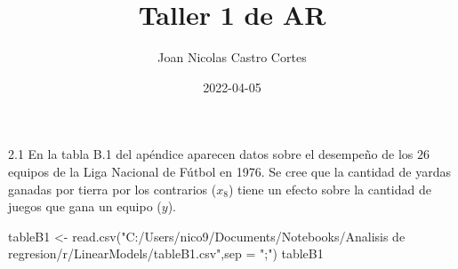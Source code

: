 \documentclass[
]{article}
\title{Taller 1 de AR}
\author{Joan Nicolas Castro Cortes}
\date{2022-04-05}
\newenvironment{Shaded}{\begin{snugshade}}{\end{snugshade}}
\newcommand{\AttributeTok}[1]{\textcolor[rgb]{0.77,0.63,0.00}{#1}}
\newcommand{\FunctionTok}[1]{\textcolor[rgb]{0.00,0.00,0.00}{#1}}
\newcommand{\NormalTok}[1]{#1}
\newcommand{\OtherTok}[1]{\textcolor[rgb]{0.56,0.35,0.01}{#1}}
\newcommand{\StringTok}[1]{\textcolor[rgb]{0.31,0.60,0.02}{#1}}
\begin{document}
\maketitle

2.1 En la tabla B.1 del apéndice aparecen datos sobre el desempeño de
los \(26\) equipos de la Liga Nacional de Fútbol en 1976. Se cree que la
cantidad de yardas ganadas por tierra por los contrarios (\(x_8\)) tiene
un efecto sobre la cantidad de juegos que gana un equipo (\(y\)).

\begin{Shaded}
\begin{Highlighting}[]
\NormalTok{tableB1 }\OtherTok{\textless{}{-}} \FunctionTok{read.csv}\NormalTok{(}\StringTok{"C:/Users/nico9/Documents/Notebooks/Analisis de regresion/r/LinearModels/tableB1.csv"}\NormalTok{,}\AttributeTok{sep =} \StringTok{";"}\NormalTok{)}
\NormalTok{tableB1}
\end{Highlighting}
\end{Shaded}
\end{document}
